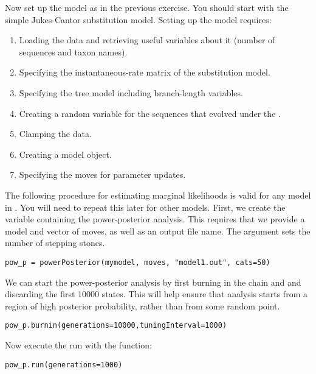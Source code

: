 Now set up the model as in the previous exercise. You should start with the simple Jukes-Cantor substitution model. 
Setting up the model requires:
\begin{enumerate}
\item Loading the data and retrieving useful variables about it (\EG number of sequences and taxon names).
\item Specifying the instantaneous-rate matrix of the substitution model.
\item Specifying the tree model including branch-length variables.
\item Creating a random variable for the sequences that evolved under the .
\item Clamping the data.
\item Creating a model object.
\item Specifying the moves for parameter updates.
\end{enumerate}

The following procedure for estimating marginal likelihoods is valid for any model in \RevBayes.
You will need to repeat this later for other models.
First, we create the variable containing the power-posterior analysis. 
This requires that we provide a model and vector of moves, as well as an output file name. 
The  argument sets the number of stepping stones.
{\tt \begin{snugshade*}
\begin{lstlisting}
pow_p = powerPosterior(mymodel, moves, "model1.out", cats=50) 
\end{lstlisting}
\end{snugshade*}}

We can start the power-posterior analysis by first burning in the chain and and discarding the first 10000 states.  
This will help ensure that analysis starts from a region of high posterior probability, rather than from some random point.
{\tt \begin{snugshade*}
\begin{lstlisting}
pow_p.burnin(generations=10000,tuningInterval=1000)
\end{lstlisting}
\end{snugshade*}}

Now execute the run with the  function:
{\tt \begin{snugshade*}
\begin{lstlisting}
pow_p.run(generations=1000)  
\end{lstlisting}
\end{snugshade*}}

